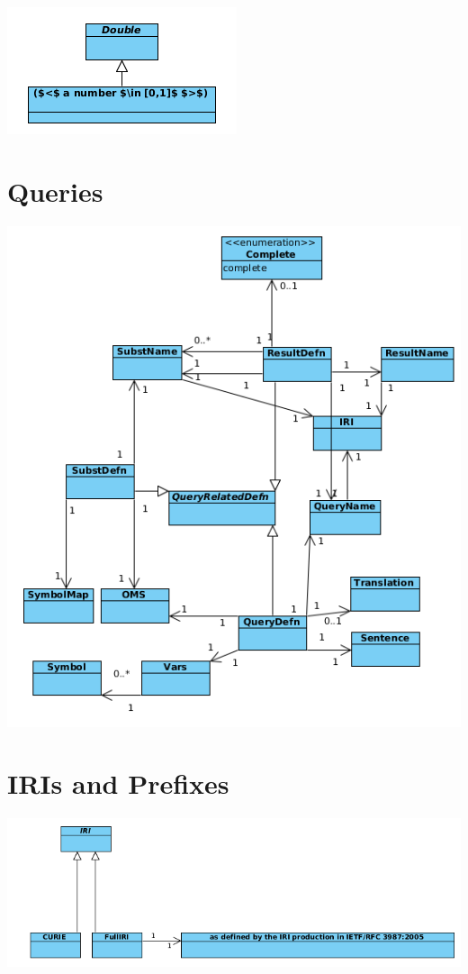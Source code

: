 \documentclass[10pt,fleqn,%
\ifpretendfinal
final%
\else
draft%
\fi,
]{scrreprt}
\newcommand{\sclause}[1]{\section{#1}}
\begin{document}
\includegraphics[scale=0.6]{mof/dia/dia5.png}

\sclause{Queries}

\includegraphics[scale=0.6]{mof/dia/dia6.png}

\sclause{IRIs and Prefixes}

\includegraphics[scale=0.6]{mof/dia/dia7.png}
\end{document}
